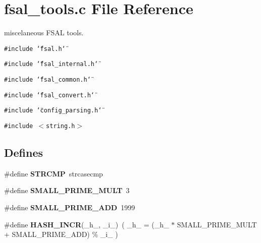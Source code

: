 \section{fsal\_\-tools.c File Reference}
\label{fsal__tools_8c}
miscelaneous FSAL tools. 

{\tt \#include \char`\"{}fsal.h\char`\"{}}\par
{\tt \#include \char`\"{}fsal\_\-internal.h\char`\"{}}\par
{\tt \#include \char`\"{}fsal\_\-common.h\char`\"{}}\par
{\tt \#include \char`\"{}fsal\_\-convert.h\char`\"{}}\par
{\tt \#include \char`\"{}config\_\-parsing.h\char`\"{}}\par
{\tt \#include $<$string.h$>$}\par
\subsection*{Defines}
\begin{CompactItemize}
\item 
\#define {\bf STRCMP}\ strcasecmp\label{fsal__tools_8c_a0}

\item 
\#define {\bf SMALL\_\-PRIME\_\-MULT}\ 3\label{fsal__tools_8c_a1}

\item 
\#define {\bf SMALL\_\-PRIME\_\-ADD}\ 1999\label{fsal__tools_8c_a2}

\item 
\#define {\bf HASH\_\-INCR}(\_\-h\_\-, \_\-i\_\-)\ ( \_\-h\_\- = (\_\-h\_\- $\ast$ SMALL\_\-PRIME\_\-MULT + SMALL\_\-PRIME\_\-ADD) \% \_\-i\_\- )\label{fsal__tools_8c_a3}

\end{CompactItemize}
